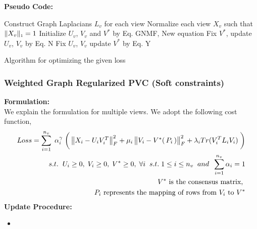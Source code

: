\documentclass[a4paper]{article}
\begin{document}
	\noindent
	\textbf{Pseudo Code:}	
	\begin{algorithm}
		Construct Graph Laplacians $L_{v}$ for each view\;
		Normalize each view $X_{v}$ such that $\|X_{v}\|_{\text{\tiny1}} = 1 $\;
		Initialize  $U_{v}$, $V_{v}$ and $V^{*}$ by Eq. GNMF, New equation\;
		{
			{
				{
					Fix $V^{*}$, update $U_{v}$, $V_{v}$ by Eq. N\;
				}
			}
			Fix $U_{v}$, $V_{v}$ update $V^{*}$ by Eq. Y\;		
		}						
		\caption{Algorithm for optimizing the given loss}
	\end{algorithm}


	\subsubsection{Weighted Graph Regularized PVC (Soft constraints)}
	
	\textbf{Formulation:}\\
	We explain the formulation for multiple views. We adopt the following cost function,
	\begin{align*}
	Loss = \displaystyle\sum_{i=1}^{n_{v}} \; \alpha_{i}^{\gamma} \; 
		\bigg(\begin{Vmatrix} X_{i}-U_{i}V^{T}_{i} \end{Vmatrix}^{2}_{F}	
		+ \mu_{i}\begin{Vmatrix} V_{i}-V^{*}(\, P_{i} \, ) \end{Vmatrix}^{2}_{F}
		+ \lambda_{i}Tr(V^{T}_{i}L_{i}V_{i}) \; \bigg)\\	
		s.t. \hspace{2mm}  U_{i}\geq0,\;V_{i}\geq0,\;V^{*}\geq0,\;\forall i \;\;s.t.\; 1 \leq i \leq n_{v}
		\;\; and \;\; \sum_{i=1}^{n_{v}} \alpha_{i} = 1 \\
		V^{*} \text{ is the consensus matrix, } \\
		P_{i} \text{ represents the mapping of rows from } V_{i} \text{ to } V^{*}
	\end{align*}
	\textbf{Update Procedure:}

	\begin{itemize}
		\item \textsc{}	
	
	\end{itemize}
\end{document}
